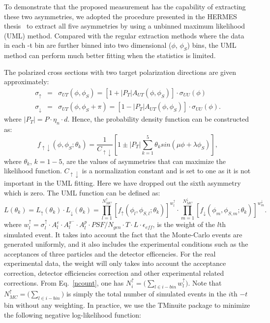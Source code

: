 To demonstrate that the proposed measurement has the capability of extracting these two asymmetries, we adopted the procedure presented in the HERMES thesis~\cite{hermes-thesis} to extract all five asymmetries by using a unbinned maximum likelihood (UML) method. Compared with the regular extraction methods where the data in each -t bin are further binned into two dimensional ($\phi$, $\phi_S$) bins, the UML method can perform much better fitting when the statistics is limited. 

The polarized cross sections with two target polarization directions are given approximately:
\begin{eqnarray}
     \sigma_{\uparrow} &=& \sigma_{UT}(\phi, \phi_{S}) = [1 + |P_{T}|A_{UT}(\phi, \phi_{S})] \cdot  \sigma_{UU}(\phi) \\
     \sigma_{\downarrow} &=& \sigma_{UT}(\phi, \phi_{S}+\pi) = [1 - |P_{T}|A_{UT}(\phi, \phi_{S})]\cdot \sigma_{UU}(\phi).
\end{eqnarray}
where $|P_{T}| = P\cdot \eta_{n} \cdot d $. Hence, the probability density function can be constructed as:
\begin{equation}
  f_{\uparrow\downarrow}(\phi, \phi_{S}; \theta_{k}) = \frac{1}{C_{\uparrow\downarrow}} [1 \pm |P_{T}| \sum_{k=1}^{5} \theta_{k} sin(\mu\phi+\lambda\phi_{S})],
\end{equation}
where $\theta_{k}$, $k=1-5$, are the values of asymmetries that can maximize the likelihood function.  $C_{\uparrow\downarrow}$ is a normalization constant and is set to one as it is not important in the UML fitting. Here we have dropped out the sixth asymmetry which is zero. The UML function can be defined as:
\begin{equation}
	L(\theta_{k}) = L_{\uparrow}(\theta_{k})\cdot  L_{\downarrow}(\theta_{k})=\prod_{l=1}^{N_{MC}^{\uparrow}}[f_{\uparrow}(\phi_{l}, \phi_{S,l};\theta_{k})]^{w^{\uparrow}_{l}}\cdot \prod_{m=1}^{N_{MC}^{\downarrow}}[f_{\downarrow}(\phi_{m}, \phi_{S,m};\theta_{k})]^{w^{\downarrow}_{m}}.
\end{equation}
where $w^{\uparrow}_{l} =  \sigma^{\uparrow}_{l}\cdot A^{e}_{l} \cdot  A^{\pi^{-}}_{l} \cdot A^{p}_{l} \cdot PSF/N_{gen} \cdot T \cdot L \cdot \epsilon_{eff}$, is the weight of the $l$th simulated event. It takes into account the fact that the Monte-Carlo events are generated uniformly, and it also includes the experimental conditions such as the acceptances of three particles and the detector efficencies. For the real experimental data, the weight will only takes into account the acceptance correction, detector efficiencies correction and other experimental related corrections. From Eq.~\ref{ncount}, one has $ N^{\uparrow}_{i} = \bigl(\sum_{l\in i-bin}w^{\uparrow}_{l})$. Note that $N_{MC}^{\uparrow}= \bigl(\sum_{l\in i-bin})$ is simply the total number of simulated events in the $i$th $-t$ bin without any weighting. In practice, we use the TMinuite package to minimize the following negative log-likelihood function:
